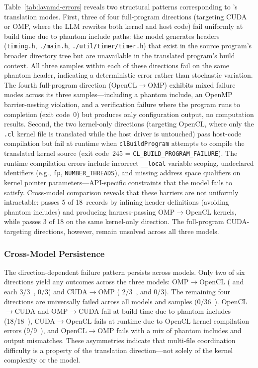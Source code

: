 Table~\ref{tab:lavamd-errors} reveals two structural patterns corresponding to \parbench{}'s translation modes. First, three of four full-program directions (targeting CUDA or OMP, where the LLM rewrites both kernel and host code) fail uniformly at build time due to phantom include paths: the model generates headers (\texttt{timing.h}, \texttt{./main.h}, \texttt{./util/timer/timer.h}) that exist in the source program's broader directory tree but are unavailable in the translated program's build context. All three samples within each of these directions fail on the same phantom header, indicating a deterministic error rather than stochastic variation. The fourth full-program direction (OpenCL$\to$OMP) exhibits mixed failure modes across its three samples---including a phantom include, an OpenMP barrier-nesting violation, and a verification failure where the program runs to completion (exit code~0) but produces only configuration output, no computation results. Second, the two kernel-only directions (targeting OpenCL, where only the \texttt{.cl} kernel file is translated while the host driver is untouched) pass host-code compilation but fail at runtime when \texttt{clBuildProgram} attempts to compile the translated kernel source (exit code~245 = \texttt{CL\_BUILD\_PROGRAM\_FAILURE}). The runtime compilation errors include incorrect \texttt{\_\_local} variable scoping, undeclared identifiers (e.g., \texttt{fp}, \texttt{NUMBER\_THREADS}), and missing address space qualifiers on kernel pointer parameters---API-specific constraints that the model fails to satisfy. Cross-model comparison reveals that these barriers are not uniformly intractable: \gptnew{} passes 5 of 18~records by inlining header definitions (avoiding phantom includes) and producing harness-passing OMP$\to$OpenCL kernels, while \codex{} passes 3 of 18 on the same kernel-only direction. The full-program CUDA-targeting directions, however, remain unsolved across all three models.

\subsubsection*{Cross-Model Persistence}
The direction-dependent failure pattern persists across models. Only two of
six directions yield any \pass{} outcomes across the three models:
OMP$\to$OpenCL (\gptnew{} and \codex{} each 3/3~\pass{}, \qwenshort{}
0/3) and CUDA$\to$OMP (\gptnew{} 2/3~\pass{}, \qwenshort{} and \codex{}
0/3). The remaining four directions are universally failed across all models
and samples (0/36~\pass{}). OpenCL$\to$CUDA and OMP$\to$CUDA fail at build
time due to phantom includes (18/18~\buildfail{}), CUDA$\to$OpenCL fails at
runtime due to OpenCL kernel compilation errors (9/9~\runfail{}), and
OpenCL$\to$OMP fails with a mix of phantom includes and output mismatches.
These asymmetries indicate that multi-file coordination difficulty is a
property of the translation direction---not solely of the kernel complexity
or the model.

